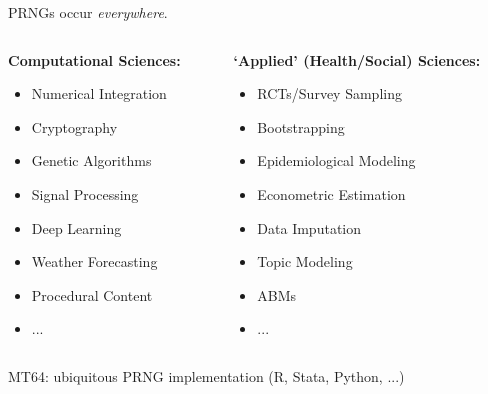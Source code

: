 \documentclass[12pt]{beamer}
\begin{document}
\begin{frame}{PRNGs occur \emph{everywhere}.}\vspace{.1in}
    \begin{columns}
        \begin{column}{0.44\textwidth}
            \textbf{Computational Sciences:}\vspace{.05in}
            \begin{itemize}
               \item Numerical Integration
               \item Cryptography
               \item Genetic Algorithms
	      \item Signal Processing
	      \item Deep Learning
      	      \item Weather Forecasting
               \item Procedural Content
	      \item ...
            \end{itemize}
        \end{column}
        
        \begin{column}{0.56\textwidth}
            \textbf{`Applied' (Health/Social) Sciences:}\vspace{.05in}
            \begin{itemize}
                \item RCTs/Survey Sampling
                \item Bootstrapping
	      \item Epidemiological Modeling
	      \item Econometric Estimation
	      \item Data Imputation
               \item Topic Modeling
	     \item ABMs
	    \item ...
            \end{itemize}
        \end{column}
    \end{columns} \vspace{.2in}
MT64: ubiquitous PRNG implementation (R, Stata, Python, ...)
\end{frame}
\end{document}
